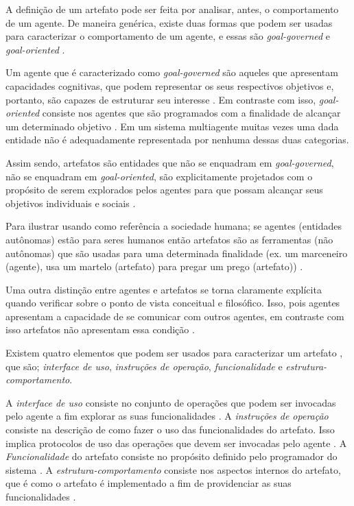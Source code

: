 A definição de um artefato pode ser feita por analisar, antes, o comportamento de um agente. De maneira genérica, existe duas formas que podem ser usadas para caracterizar o comportamento de um agente, e essas são \textit{goal-governed} e \textit{goal-oriented} \cite{relationwithagentprogram} \cite{programingagentartefact}.

Um agente que é caracterizado como \textit{goal-governed} são aqueles que apresentam capacidades cognitivas, que podem representar os seus respectivos objetivos e, portanto, são capazes de estruturar seu interesse \cite{relationwithagentprogram} \cite{programingagentartefact}. Em contraste com isso, \textit{goal-oriented} consiste nos agentes que são programados com a finalidade de alcançar um determinado objetivo \cite{relationwithagentprogram} \cite{programingagentartefact}. Em um sistema multiagente muitas vezes
uma dada entidade não é adequadamente representada por nenhuma dessas duas categorias. 

Assim sendo, artefatos são entidades que não se enquadram em  \textit{goal-governed}, não se enquadram em \textit{goal-oriented}, são explicitamente projetados com o propósito de serem explorados pelos agentes para que possam alcançar seus objetivos individuais e sociais \cite{programingagentartefact} \cite{cartago}. 

Para ilustrar usando como referência a sociedade humana; se agentes (entidades autônomas) estão para seres humanos então artefatos são as ferramentas (não autônomas) que são usadas para uma determinada finalidade (ex. um marceneiro (agente), usa um martelo (artefato) para pregar um prego (artefato)) \cite{programingagentartefact}.

Uma outra distinção entre agentes e artefatos se torna claramente explícita quando verificar sobre o ponto de vista conceitual e filosófico. Isso, pois agentes apresentam a capacidade de se comunicar com outros agentes, em contraste com isso artefatos não apresentam essa condição \cite{programingagentartefact}.

Existem quatro elementos que podem ser usados para caracterizar um artefato \cite{programingagentartefact}, que são; \textit{interface de uso}, \textit{instruções de operação}, \textit{funcionalidade} e \textit{estrutura-comportamento}.

A \textit{interface de uso} consiste no conjunto de operações que podem ser invocadas pelo agente a fim explorar as suas funcionalidades \cite{programingagentartefact}. A \textit{instruções de operação} consiste na descrição de como fazer o uso das funcionalidades do artefato. Isso implica protocolos de uso das operações que devem ser invocadas pelo agente \cite{programingagentartefact}. A \textit{Funcionalidade} do artefato consiste no propósito definido pelo programador do sistema \cite{programingagentartefact}. A \textit{estrutura-comportamento} consiste nos aspectos internos do artefato, que é como o artefato é implementado a fim de providenciar as suas funcionalidades \cite{programingagentartefact}.    

